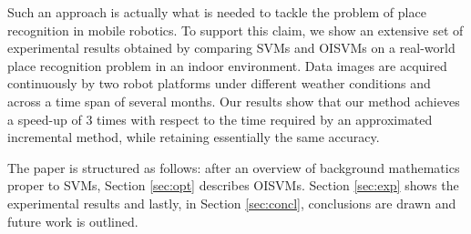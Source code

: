 Such an approach is actually what is needed to tackle the problem of
place recognition in mobile robotics. To support this claim, we show
an extensive set of experimental results obtained by comparing SVMs
and OISVMs on a real-world place recognition problem in an indoor
environment. Data images are acquired continuously by two robot
platforms under different weather conditions and across a time span of
several months. Our results show that our method achieves a speed-up
of $3$ times with respect to the time required by an approximated
incremental method, while retaining essentially the same accuracy.

The paper is structured as follows: after an overview  of background
mathematics proper to SVMs,  Section \ref{sec:opt} describes OISVMs.
Section \ref{sec:exp} shows the experimental results and
lastly, in Section \ref{sec:concl}, conclusions are drawn and future
work is outlined.
